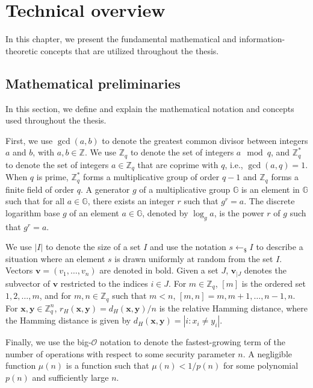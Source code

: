 


%

\chapter{Technical overview}
\label{ch:tech-overview}

In this chapter, we present the fundamental mathematical and information-theoretic concepts that are utilized throughout the thesis.

\section{Mathematical preliminaries}

In this section, we define and explain the mathematical notation and concepts used throughout the thesis.

First, we use $\gcd(a,b)$ to denote the greatest common divisor between integers $a$ and $b$, with $a,b \in \mathbb{Z}$. We use $\mathbb{Z}_q$ to denote the set of integers $a \mod q$, and $\mathbb{Z}^*_q$ to denote the set of integers $a \in \mathbb{Z}_q$ that are coprime with $q$, i.e., $\gcd(a,q) = 1$. When $q$ is prime, $\mathbb{Z}^*_q$ forms a multiplicative group of order $q-1$ and $\mathbb{Z}_q$ forms a finite field of order $q$. A generator $g$ of a multiplicative group $\mathbb{G}$ is an element in $\mathbb{G}$ such that for all $a \in \mathbb{G}$, there exists an integer $r$ such that $g^r = a$. The discrete logarithm base $g$ of an element $a \in \mathbb{G}$, denoted by $\log_g a$, is the power $r$ of $g$ such that $g^r = a$.

We use $|I|$ to denote the size of a set $I$ and use the notation  $s\leftarrow_{\$}I$ to describe a situation where an element $s$ is drawn uniformly at random from the set $I$. Vectors $\bm{v} = (v_1, \ldots, v_n)$ are denoted in bold. Given a set $J$, $\bm{v}_{|J}$ denotes the subvector of $\bm{v}$ restricted to the indices $i \in J$. For $m \in \mathbb{Z}_q$, $[m]$ is the ordered set ${1, 2, \ldots, m}$, and for $m, n \in \mathbb{Z}_q$ such that $m < n$, $[m, n] = {m, m+1, \ldots, n-1, n}$. For $\bm{x}, \bm{y} \in \mathbb{Z}^n_q$, $r_H(\bm{x}, \bm{y}) = d_H(\bm{x}, \bm{y})/n$ is the relative Hamming distance, where the Hamming distance is given by $d_H(\bm{x}, \bm{y}) = |{i : x_i \neq y_i}|$.

Finally, we use the big-$\mathcal{O}$ notation to denote the fastest-growing term of the number of operations with respect to some security parameter $n$. A negligible function $\mu(n)$ is a function such that $\mu(n) < 1/p(n)$ for some polynomial $p(n)$ and sufficiently large $n$.



